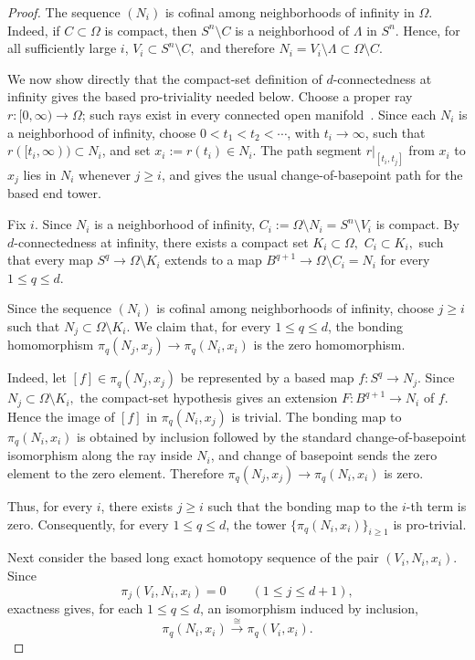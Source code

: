 \documentclass[12pt,oneside,a4paper]{article}
\theoremstyle{mytheorem}
\theoremstyle{remark}
\theoremstyle{definition}
\begin{document}
\begin{proof}
The sequence \((N_i)\) is cofinal among neighborhoods of infinity in \(\Omega\).
Indeed, if \(C\subset \Omega\) is compact, then $S^n\setminus C$
is a neighborhood of \(\Lambda\) in \(S^n\). Hence, for all sufficiently large
\(i\), $V_i\subset S^n\setminus C,$
and therefore $N_i=V_i\setminus\Lambda\subset \Omega\setminus C.$

We now show directly that the compact-set definition of \(d\)-connectedness at
infinity gives the based pro-triviality needed below. Choose a proper ray
\(r\colon[0,\infty)\to\Omega\); such rays exist in every connected open
manifold~\cite[Section~3.3.3]{zbMATH07206284}.
Since each \(N_i\) is a neighborhood of infinity, choose
\(0<t_1<t_2<\cdots\), with \(t_i\to\infty\), such that
\(r([t_i,\infty))\subset N_i\), and set \(x_i:=r(t_i)\in N_i\).
The path segment \(r|_{[t_i,t_j]}\) from \(x_i\) to \(x_j\) lies in \(N_i\)
whenever \(j\ge i\),
and gives the usual change-of-basepoint path for the based end tower.

Fix \(i\). Since \(N_i\) is a neighborhood of infinity,
$C_i:=\Omega \setminus N_i=S^n\setminus V_i$
is compact. By \(d\)-connectedness at infinity, there exists a compact set
$K_i\subset \Omega,$ $C_i\subset K_i,$
such that every map $S^q\to \Omega\setminus K_i$
extends to a map
$B^{q+1}\to \Omega\setminus C_i=N_i$ for every \(1\le q\le d\).

Since the sequence \((N_i)\) is cofinal among neighborhoods of infinity, choose
\(j\ge i\) such that $N_j\subset \Omega\setminus K_i.$
We claim that, for every \(1\le q\le d\), the bonding homomorphism
$\pi_q(N_j,x_j)\to \pi_q(N_i,x_i)$ is the zero homomorphism.

Indeed, let $[f]\in \pi_q(N_j,x_j)$
be represented by a based map
$f\colon S^q\to N_j.$ Since $N_j\subset \Omega\setminus K_i,$
the compact-set hypothesis gives an extension \(F\colon B^{q+1}\to N_i\)
of \(f\). Hence the image of \([f]\) in \(\pi_q(N_i,x_j)\) is trivial. The
bonding map to \(\pi_q(N_i,x_i)\) is obtained by inclusion followed by the
standard change-of-basepoint isomorphism along the ray inside \(N_i\), and
change of basepoint sends the zero element to the zero element. Therefore
$\pi_q(N_j,x_j)\to \pi_q(N_i,x_i)$ is zero.

Thus, for every \(i\), there exists \(j\ge i\) such that the bonding map to the
\(i\)-th term is zero. Consequently, for every \(1\le q\le d\), the tower
\(\{\pi_q(N_i,x_i)\}_{i\ge1}\) is pro-trivial.

Next consider the based long exact homotopy sequence of the pair $(V_i,N_i,x_i).$
Since
\[
\pi_j(V_i,N_i,x_i)=0
\qquad
(1\le j\le d+1),
\]
exactness gives, for each \(1\le q\le d\), an isomorphism induced by inclusion,
\[
\pi_q(N_i,x_i)\xrightarrow{\cong}\pi_q(V_i,x_i).
\]


\end{proof}
\end{document}
